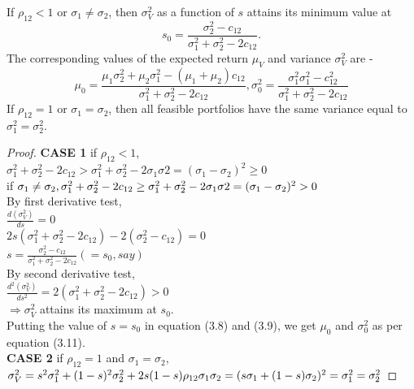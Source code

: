\begin{theorem}
If $\rho_{12}<1$ or $\sigma_{1}\neq \sigma_{2}$, then $\sigma_{V}^{2}$ as a function of $s$ attains its minimum value at 
\begin{equation}
    s_{0}=\frac{\sigma_{2}^{2}-c_{12}}{\sigma_{1}^{2}+\sigma_{2}^{2}-2c_{12}}.
\end{equation}
The corresponding values of the expected return $\mu_{V}$ and variance $\sigma_{V}^{2}$ are -
\begin{equation}
    \mu_{0}=\frac{\mu_{1}\sigma_{2}^{2}+\mu_{2}\sigma_{1}^{2}-(\mu_{1}+\mu_{2})c_{12}}{\sigma_{1}^{2}+\sigma_{2}^{2}-2c_{12}},
    \sigma_{0}^{2}=\frac{\sigma_{1}^{2}\sigma_{1}^{2}-c_{12}^{2}}{\sigma_{1}^{2}+\sigma_{2}^{2}-2c_{12}}
\end{equation}
If $\rho_{12}=1$ or $\sigma_{1} = \sigma_{2}$, then all feasible portfolios have the same variance equal to $\sigma_{1}^{2}=\sigma_{2}^{2}$.
\end{theorem}
\begin{proof}
    \textbf{CASE 1} if $\rho_{12}<1$,
    \\$\sigma_{1}^{2}+\sigma_{2}^{2}-2c_{12} > \sigma_{1}^{2}+\sigma_{2}^{2}-2\sigma_{1}\sigma{2} = (\sigma_{1}-\sigma_{2})^{2} \geq 0$
    \\if $\sigma_{1}\neq \sigma_{2}, \\\sigma_{1}^{2}+\sigma_{2}^{2}-2c_{12} \geq \sigma_{1}^{2}+\sigma_{2}^{2}-2\sigma_{1}\sigma{2} = (\sigma_{1}-\sigma_{2})^{2} > 0$\\
    By first derivative test,\\
    $\frac{d(\sigma_{V}^{2})}{ds}=0$\\
    $2s(\sigma_{1}^{2}+\sigma_{2}^{2}-2c_{12})-2(\sigma_{2}^{2}-c_{12})=0$\\
    $s=\frac{\sigma_{2}^{2}-c_{12}}{\sigma_{1}^{2}+\sigma_{2}^{2}-2c_{12}} (=s_{0}, say)$\\
    By second derivative test, \\
    $\frac{d^{2}(\sigma_{V}^{2})}{ds^{2}}=2(\sigma_{1}^{2}+\sigma_{2}^{2}-2c_{12})>0$\\
    $\Rightarrow \sigma_{V}^{2}$ attains its maximum at $s_{0}$.\\
    Putting the value of $s=s_{0}$ in equation (3.8) and (3.9), we get $\mu_{0}$ and $\sigma_{0}^{2}$ as per equation (3.11).
    \\\textbf{CASE 2} if $\rho_{12}=1$ and $\sigma_{1} = \sigma_{2}$,
    \\$\sigma_{V}^{2} = s^2\sigma_{1}^{2}+(1-s)^2\sigma_{2}^{2}+2s(1-s)\rho_{12}\sigma_{1}\sigma_{2} = (s\sigma_{1}+(1-s)\sigma_{2})^{2}=\sigma_{1}^{2}=\sigma_{2}^{2}\\$
    
\end{proof}

